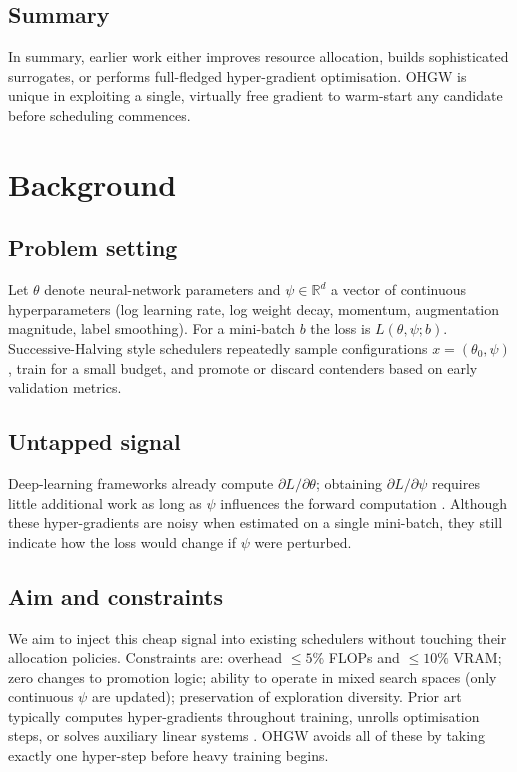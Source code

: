 \documentclass{article} %
\begin{document}
\subsection{Summary}
In summary, earlier work either improves resource allocation, builds sophisticated surrogates, or performs full-fledged hyper-gradient optimisation. OHGW is unique in exploiting a single, virtually free gradient to warm-start any candidate before scheduling commences.

\section{Background}
\label{sec:background}
\subsection{Problem setting}
Let \(\theta\) denote neural-network parameters and \(\psi\in\mathbb{R}^d\) a vector of continuous hyperparameters (log learning rate, log weight decay, momentum, augmentation magnitude, label smoothing). For a mini-batch \(b\) the loss is \(L(\theta,\psi; b)\). Successive-Halving style schedulers repeatedly sample configurations \(x=(\theta_0,\psi)\), train for a small budget, and promote or discard contenders based on early validation metrics.

\subsection{Untapped signal}
Deep-learning frameworks already compute \(\partial L/\partial \theta\); obtaining \(\partial L/\partial \psi\) requires little additional work as long as \(\psi\) influences the forward computation \cite{chandra-2019-gradient}. Although these hyper-gradients are noisy when estimated on a single mini-batch, they still indicate how the loss would change if \(\psi\) were perturbed.

\subsection{Aim and constraints}
We aim to inject this cheap signal into existing schedulers without touching their allocation policies. Constraints are: overhead \(\leq 5\%\) FLOPs and \(\leq 10\%\) VRAM; zero changes to promotion logic; ability to operate in mixed search spaces (only continuous \(\psi\) are updated); preservation of exploration diversity. Prior art typically computes hyper-gradients throughout training, unrolls optimisation steps, or solves auxiliary linear systems \cite{bertrand-2020-implicit,immer-2023-stochastic}. OHGW avoids all of these by taking exactly one hyper-step before heavy training begins.
\end{document}
